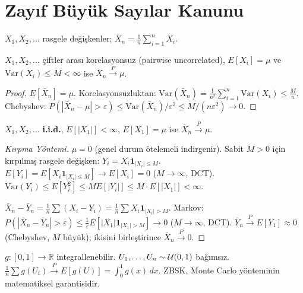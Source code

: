 \section{Zayıf Büyük Sayılar Kanunu}
\label{sec:zbsk}

\begin{tanim}
$X_1, X_2, \ldots$ rasgele değişkenler; $\bar{X}_n = \frac{1}{n}\sum_{i=1}^n X_i$.
\end{tanim}

\begin{teorem}
\label{thm:chebyshev_zbsk}
$X_1, X_2, \ldots$ çiftler arası korelasyonsuz (pairwise uncorrelated),
$E[X_i] = \mu$ ve $\mathrm{Var}(X_i) \leq M < \infty$ ise
$\bar{X}_n \xrightarrow{P} \mu$.
\end{teorem}

\begin{proof}
$E[\bar{X}_n] = \mu$. Korelasyonsuzluktan:
$\mathrm{Var}(\bar{X}_n) = \frac{1}{n^2}\sum_{i=1}^n \mathrm{Var}(X_i) \leq \frac{M}{n}$.
Chebyshev: $P(|\bar{X}_n - \mu| > \varepsilon) \leq \mathrm{Var}(\bar{X}_n)/\varepsilon^2 \leq M/(n\varepsilon^2) \to 0$.
\end{proof}

\begin{teorem}
\label{thm:zbsk_genel}
$X_1, X_2, \ldots$ \textbf{i.i.d.}, $E[|X_1|] < \infty$, $E[X_1] = \mu$ ise
$\bar{X}_n \xrightarrow{P} \mu$.
\end{teorem}

\begin{proof}[Kırpma Yöntemi]
$\mu = 0$ (genel durum ötelemeli indirgenir). Sabit $M > 0$ için kırpılmış rasgele değişken:
$Y_i = X_i \mathbf{1}_{|X_i| \leq M}$.
$E[Y_i] = E[X_i \mathbf{1}_{|X_i|\leq M}] \to E[X_i] = 0$ ($M\to\infty$, DCT).
$\mathrm{Var}(Y_i) \leq E[Y_i^2] \leq ME[|Y_i|] \leq M \cdot E[|X_1|] < \infty$.

$\bar{X}_n - \bar{Y}_n = \frac{1}{n}\sum(X_i - Y_i) = \frac{1}{n}\sum X_i \mathbf{1}_{|X_i|>M}$.
Markov: $P(|\bar{X}_n - \bar{Y}_n| > \varepsilon) \leq \frac{1}{\varepsilon}E[|X_1|\mathbf{1}_{|X_1|>M}] \to 0$
($M\to\infty$, DCT).
$\bar{Y}_n \xrightarrow{P} E[Y_1] \approx 0$ (Chebyshev, $M$ büyük); ikisini birleştirince $\bar{X}_n \xrightarrow{P} 0$.
\end{proof}

\begin{ornek}
$g : [0,1] \to \mathbb{R}$ integrallenebilir. $U_1, \ldots, U_n \sim \mathcal{U}(0,1)$ bağımsız.
$\frac{1}{n}\sum g(U_i) \xrightarrow{P} E[g(U)] = \int_0^1 g(x)\,dx$.
ZBSK, Monte Carlo yönteminin matematiksel garantisidir.
\end{ornek}

